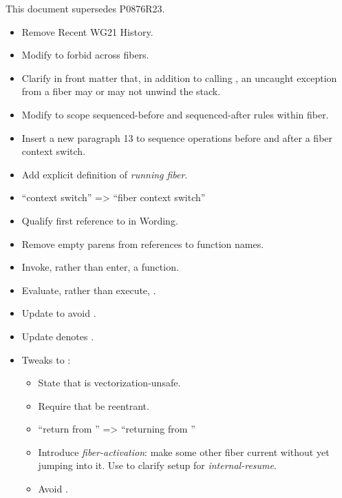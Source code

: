 \label{history}
This document supersedes P0876R23.


\begin{itemize}
    \item Remove Recent WG21 History.
    \item Modify  to forbid  across fibers.
    \item Clarify in front matter that, in addition to calling , an
          uncaught exception from a fiber may or may not unwind the stack.
    \item Modify  to scope sequenced-before and
          sequenced-after rules within fiber.
    \item Insert a new  paragraph 13 to sequence
          operations before and after a fiber context switch.
    \item Add explicit definition of \emph{running fiber}.
    \item ``context switch'' => ``fiber context switch''
    \item Qualify first reference to \stdfiber in Wording.
    \item Remove empty parens from references to function names.
    \item Invoke, rather than enter, a function.
    \item Evaluate, rather than execute, .
    \item Update \mandates to avoid .
    \item Update \mandates {}\add{\cpp{\&\&}} denotes \fiber\add{\cpp{\&\&}}.
    \item Tweaks to \resumewith:
    \begin{itemize}
        \item State that \resumewith is vectorization-unsafe.
        \item Require that \resumewith be reentrant.
        \item ``return from \resumewith'' => ``returning from \resumewith''
        \item Introduce \emph{fiber-activation}: make some other fiber
              current without yet jumping into it. Use to clarify setup
              for \emph{internal-resume}.
        \item Avoid .

\end{itemize}
\end{itemize}
